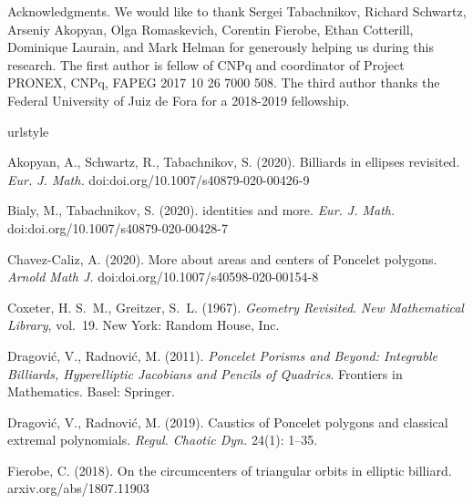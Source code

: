 \documentclass{article}
\theoremstyle{definition}
\begin{document}
\begin{acknowledgment}{Acknowledgments.}
 We would like to thank  
Sergei Tabachnikov, Richard Schwartz, Arseniy Akopyan, Olga Romaskevich, Corentin Fierobe, Ethan Cotterill, Dominique Laurain, and Mark Helman for generously helping us during this research.  The first author is fellow of CNPq and coordinator of Project PRONEX, CNPq, FAPEG 2017 10 26 7000 508. The third author thanks the Federal University of Juiz de Fora for a 2018-2019 fellowship.
\end{acknowledgment}

\begin{thebibliography}{10}
\expandafter\ifx\csname urlstyle\endcsname\relax
 \providecommand{\url}[1]{doi:\discretionary{}{}{}#1}\else
 \providecommand{\url}{doi:\discretionary{}{}{}\begingroup
  \urlstyle{rm}\Url}\fi

Akopyan, A., Schwartz, R., Tabachnikov, S. (2020).
\newblock Billiards in ellipses revisited.
\newblock \emph{Eur. J. Math.}
\newblock \url{doi.org/10.1007/s40879-020-00426-9}

Bialy, M., Tabachnikov, S. (2020).
 identities and more.
\newblock \emph{Eur. J. Math.}
\newblock \url{doi.org/10.1007/s40879-020-00428-7}

Chavez-Caliz, A. (2020).
\newblock More about areas and centers of {P}oncelet polygons.
\newblock \emph{Arnold Math J.}
\newblock \url{doi.org/10.1007/s40598-020-00154-8}

Coxeter, H. S.~M., Greitzer, S.~L. (1967).
\newblock \emph{Geometry Revisited}. \emph{New Mathematical
  Library}, vol.~19.
\newblock New York: Random House, Inc.

Dragovi\'{c}, V., Radnovi\'{c}, M. (2011).
\newblock \emph{{P}oncelet Porisms and Beyond: Integrable Billiards,
  Hyperelliptic Jacobians and Pencils of Quadrics}.
\newblock Frontiers in Mathematics. Basel: Springer.

Dragovi\'{c}, V., Radnovi\'{c}, M. (2019).
\newblock Caustics of {P}oncelet polygons and classical extremal polynomials.
\newblock \emph{Regul. Chaotic Dyn.} 24(1): 1--35.

Fierobe, C. (2018).
\newblock On the circumcenters of triangular orbits in elliptic billiard.
\newblock arxiv.org/abs/1807.11903


\end{thebibliography}
\end{document}
